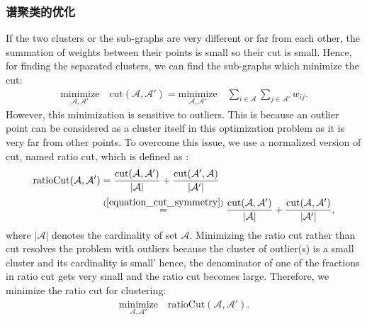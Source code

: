 \documentclass[lang=cn,10pt]{gorgeousnbook}
\numberwithin{equation}{section}%
\numberwithin{figure}{section}%
\begin{document}
\subsubsection{谱聚类的优化}

If the two clusters or the sub-graphs are very different or far from each other, the summation of weights between their points is small so their cut is small. Hence, for finding the separated clusters, we can find the sub-graphs which minimize the cut:
\begin{align}
\underset{\mathcal{A}, \mathcal{A}'}{\text{minimize}} \quad \text{cut}(\mathcal{A}, \mathcal{A}') = \underset{\mathcal{A}, \mathcal{A}'}{\text{minimize}} \quad \sum_{i \in \mathcal{A}} \sum_{j \in \mathcal{A}'} w_{ij}.
\end{align}
However, this minimization is sensitive to outliers. This is because an outlier point can be considered as a cluster itself in this optimization problem as it is very far from other points. 
To overcome this issue, we use a normalized version of cut, named ratio cut, which is defined as \cite{shi1997normalized,shi2000normalized}:
\begin{align}
\text{ratioCut}(\mathcal{A}, \mathcal{A}') &= \frac{\text{cut}(\mathcal{A}, \mathcal{A}')}{|\mathcal{A}|} + \frac{\text{cut}(\mathcal{A}', \mathcal{A})}{|\mathcal{A}'|} \nonumber \\
&\overset{(\ref{equation_cut_symmetry})}{=} \frac{\text{cut}(\mathcal{A}, \mathcal{A}')}{|\mathcal{A}|} + \frac{\text{cut}(\mathcal{A}, \mathcal{A}')}{|\mathcal{A}'|}, \label{equation_ratio_cut}
\end{align}
where $|\mathcal{A}|$ denotes the cardinality of set $\mathcal{A}$. Minimizing the ratio cut rather than cut resolves the problem with outliers because the cluster of outlier(s) is a small cluster and its cardinality is small' hence, the denominator of one of the fractions in ratio cut gets very small and the ratio cut becomes large. Therefore, we minimize the ratio cut for clustering:
\begin{align}\label{equation_min_ratio_cut}
\underset{\mathcal{A}, \mathcal{A}'}{\text{minimize}} \quad \text{ratioCut}(\mathcal{A}, \mathcal{A}').
\end{align}
\end{document}
